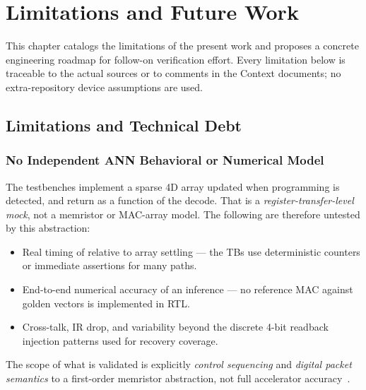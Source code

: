 
\chapter{Limitations and Future Work}
\label{ch:limitations}

This chapter catalogs the limitations of the present work and proposes
a concrete engineering roadmap for follow-on verification effort. Every
limitation below is traceable to the actual  sources or to
comments in the Context documents; no extra-repository device assumptions
are used.

\section{Limitations and Technical Debt}
\label{sec:lim-limitations}

\subsection{No Independent ANN Behavioral or Numerical Model}
\label{sec:lim-nomodel}

The testbenches implement a sparse 4D array
 updated when programming is detected, and
return  as a function of the
 decode. That is a
\emph{register-transfer-level mock}, not a memristor or MAC-array model.
The following are therefore untested by this abstraction:

\begin{itemize}
    \item Real timing of  relative to array
          settling --- the TBs use deterministic counters or immediate
          assertions for many paths.
    \item End-to-end numerical accuracy of an inference --- no
          reference MAC against golden vectors is implemented in RTL.
    \item Cross-talk, IR drop, and variability beyond the discrete
          4-bit readback injection patterns used for recovery
          coverage.
\end{itemize}

The scope of what is validated is explicitly \emph{control sequencing}
and \emph{digital packet semantics} to a first-order memristor
abstraction, not full accelerator accuracy~\cite{Ielmini2018RRAM,
Sebastian2020IMC}.

